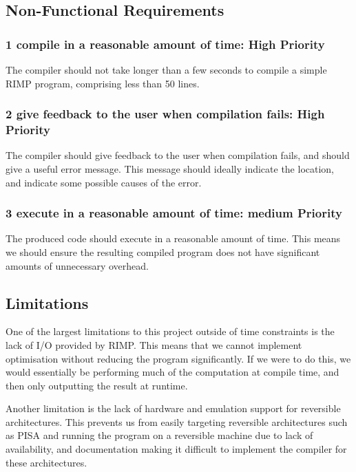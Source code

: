 \subsection*{Non-Functional Requirements}

\subsubsection[1]{1 compile in a reasonable amount of time: High Priority}
The compiler should not take longer than a few seconds to compile a simple RIMP program, comprising less than 50 lines.

\subsubsection[2]{2 give feedback to the user when compilation fails: High Priority}
The compiler should give feedback to the user when compilation fails, and should give a useful error message.
This message should ideally indicate the location, and indicate some possible causes of the error.

\subsubsection[3]{3 execute in a reasonable amount of time: medium Priority}
The produced code should execute in a reasonable amount of time.
This means we should ensure the resulting compiled program does not have significant amounts of unnecessary overhead.

\subsection*{Limitations}
One of the largest limitations to this project outside of time constraints is the lack of I/O provided by RIMP\@.
This means that we cannot implement optimisation without reducing the program significantly.
If we were to do this, we would essentially be performing much of the computation at compile time, and then only outputting the result at runtime.

Another limitation is the lack of hardware and emulation support for reversible architectures.
This prevents us from easily targeting reversible architectures such as PISA and running the program on a reversible machine due to lack of availability, and documentation making it difficult to implement the compiler for these architectures.
